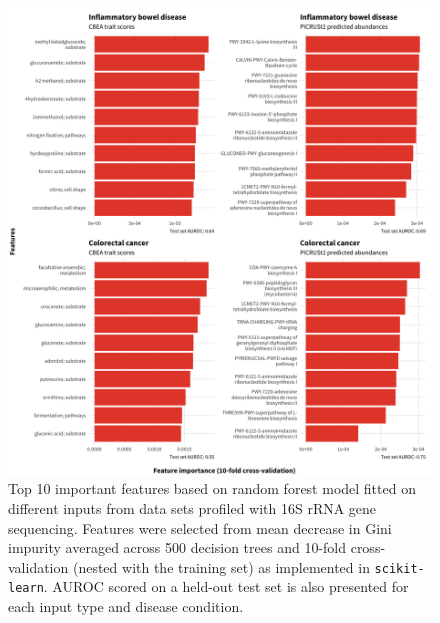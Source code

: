 \documentclass[10pt,letterpaper]{article}
\begin{document}
\begin{figure}[!h]
\includegraphics[width=0.99\linewidth]{figures/feat_importance_16s.png}
\caption{Top 10 important features based on random forest model fitted on different inputs from data sets profiled with 16S rRNA gene sequencing.  Features were selected from mean decrease in Gini impurity averaged across 500 decision trees and 10-fold cross-validation (nested with the training set) as implemented in \texttt{scikit-learn}. AUROC scored on a held-out test set is also presented for each input type and disease condition.}
\label{fig:s2}
\end{figure}
\end{document}
